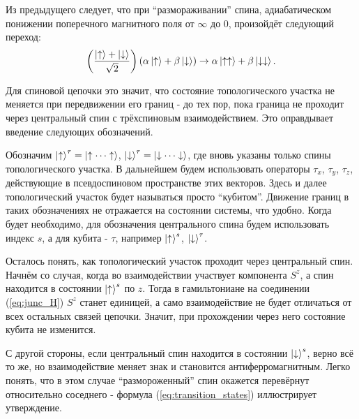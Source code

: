 \documentclass[a4paper,12pt]{article}
\theoremstyle{plain} %
\theoremstyle{definition} %
\theoremstyle{remark} %
\begin{document}
Из предыдущего следует, что при ``размораживании'' спина, адиабатическом понижении поперечного магнитного поля от $\infty$ до $0$, произойдёт следующий переход:
\begin{equation*}
    \left( \frac{\ket{\uparrow} + \ket{\downarrow}}{\sqrt{2}} \right) (\alpha \ket{\uparrow} + \beta \ket{\downarrow}) \rightarrow \alpha \ket{\uparrow\uparrow} + \beta \ket{\downarrow\downarrow}.
\end{equation*}

Для спиновой цепочки это значит, что состояние топологического участка не меняется при передвижении его границ -  до тех пор, пока граница не проходит через центральный спин с трёхспиновым взаимодействием. Это оправдывает введение следующих обозначений.

Обозначим $\ket{\uparrow}^\tau = \ket{\uparrow \dotsm \uparrow}$, $\ket{\downarrow}^\tau = \ket{\downarrow \dotsm \downarrow}$, где вновь указаны только спины топологического участка. В дальнейшем будем использовать операторы $\tau_x$, $\tau_y$, $\tau_z$, действующие в псевдоспиновом пространстве этих векторов. Здесь и далее топологический участок будет называться просто ``кубитом''. Движение границ в таких обозначениях не отражается на состоянии системы, что удобно. Когда будет необходимо, для обозначения центрального спина будем использовать индекс $s$, а для кубита - $\tau$, например $\ket{\uparrow}^s$, $\ket{\downarrow}^\tau$. 

Осталось понять, как топологический участок проходит через центральный спин. Начнём со случая, когда во взаимодействии участвует компонента $S^z$, а спин находится в состоянии $\ket{\uparrow}^s$ по $z$. Тогда в гамильтониане на соединении (\ref{eq:junc_H}) $S^z$ станет единицей, а само взаимодействие не будет отличаться от всех остальных связей цепочки. Значит, при прохождении через него состояние кубита не изменится.

С другой стороны, если центральный спин находится в состоянии $\ket{\downarrow}^s$, верно всё то же, но взаимодействие меняет знак и становится антиферромагнитным. Легко понять, что в этом случае ``размороженный'' спин окажется перевёрнут относительно соседнего - формула (\ref{eq:transition_states}) иллюстрирует утверждение.
\end{document}
